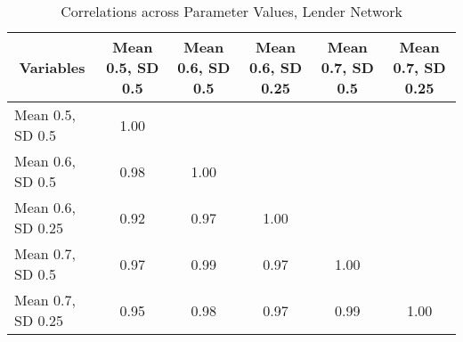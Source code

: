 \begin{table}[htbp]\centering \caption{Correlations across Parameter Values, Lender Network\label{corr_lender}}
\begin{tabular}{l  c  c  c  c  c }\hline\hline
\multicolumn{1}{c}{Variables} &Mean 0.5, SD 0.5&Mean 0.6, SD 0.5&Mean 0.6, SD 0.25&Mean 0.7, SD 0.5&Mean 0.7, SD 0.25\\ \hline
Mean 0.5, SD 0.5&1.00\\
Mean 0.6, SD 0.5&0.98&1.00\\
Mean 0.6, SD 0.25&0.92&0.97&1.00\\
Mean 0.7, SD 0.5&0.97&0.99&0.97&1.00\\
Mean 0.7, SD 0.25&0.95&0.98&0.97&0.99&1.00\\
\hline \hline 
 \end{tabular}
\end{table}
